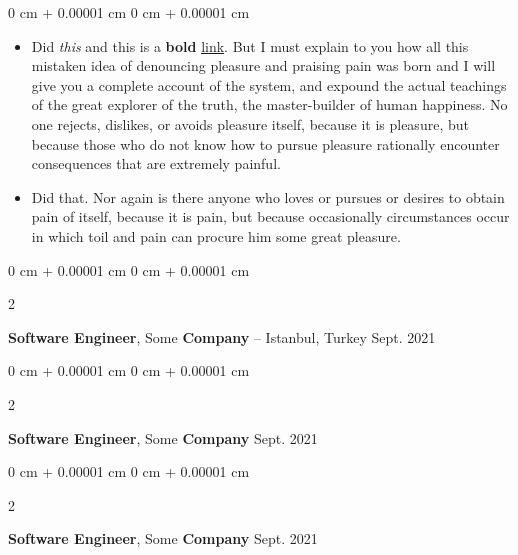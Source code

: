 \documentclass[10pt, letterpaper]{article}
\newenvironment{highlights}{
    \begin{itemize}[
        topsep=0.10 cm,
        parsep=0.10 cm,
        partopsep=0pt,
        itemsep=0pt,
        leftmargin=0 cm + 10pt
    ]
}{
    \end{itemize}
} %
\newenvironment{onecolentry}{
    \begin{adjustwidth}{
        0 cm + 0.00001 cm
    }{
        0 cm + 0.00001 cm
    }
}{
    \end{adjustwidth}
} %
\newenvironment{twocolentry}[2][]{
    \onecolentry
    \def\secondColumn{#2}
    \setcolumnwidth{\fill, 4.5 cm}
    \begin{paracol}{2}
}{
    \switchcolumn \raggedleft \secondColumn
    \end{paracol}
    \endonecolentry
} %
\begin{document}
        \vspace{0.10 cm}
        \begin{onecolentry}
            \begin{highlights}
                \item Did \textit{this} and this is a \textbf{bold} \href{https://example.com}{link}. But I must explain to you how all this mistaken idea of denouncing pleasure and praising pain was born and I will give you a complete account of the system, and expound the actual teachings of the great explorer of the truth, the master-builder of human happiness. No one rejects, dislikes, or avoids pleasure itself, because it is pleasure, but because those who do not know how to pursue pleasure rationally encounter consequences that are extremely painful.
                \item Did that. Nor again is there anyone who loves or pursues or desires to obtain pain of itself, because it is pain, but because occasionally circumstances occur in which toil and pain can procure him some great pleasure.
            \end{highlights}
        \end{onecolentry}


        \vspace{0.2 cm}

        \begin{twocolentry}{
            Sept. 2021
        }
            \textbf{Software Engineer}, Some \textbf{Company} -- Istanbul, Turkey\end{twocolentry}



        \vspace{0.2 cm}

        \begin{twocolentry}{
            Sept. 2021
        }
            \textbf{Software Engineer}, Some \textbf{Company}\end{twocolentry}



        \vspace{0.2 cm}

        \begin{twocolentry}{
            Sept. 2021
        }
            \textbf{Software Engineer}, Some \textbf{Company}\end{twocolentry}



        \vspace{0.2 cm}
\end{document}
